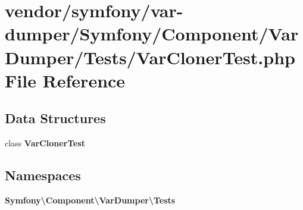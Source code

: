 \section{vendor/symfony/var-\/dumper/\+Symfony/\+Component/\+Var\+Dumper/\+Tests/\+Var\+Cloner\+Test.php File Reference}
\label{_var_cloner_test_8php}
\subsection*{Data Structures}
\begin{DoxyCompactItemize}
\item 
class {\bf Var\+Cloner\+Test}
\end{DoxyCompactItemize}
\subsection*{Namespaces}
\begin{DoxyCompactItemize}
\item 
 {\bf Symfony\textbackslash{}\+Component\textbackslash{}\+Var\+Dumper\textbackslash{}\+Tests}
\end{DoxyCompactItemize}

